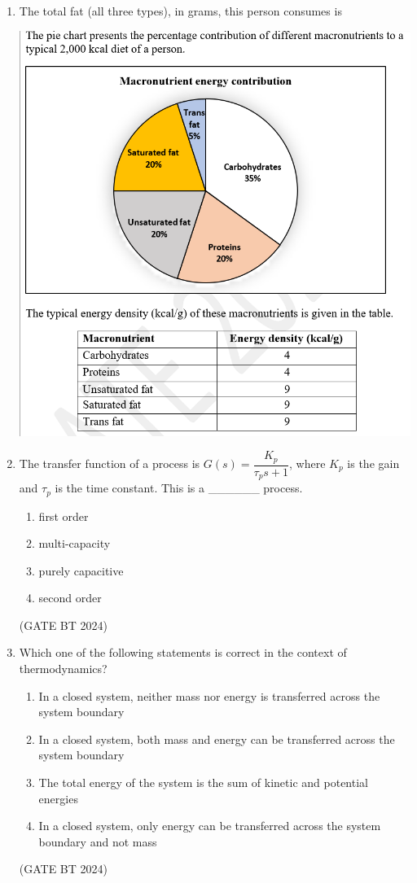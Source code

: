 \documentclass[journal,12pt,onecolumn]{IEEEtran}
\theoremstyle{remark}
\begin{document}
\begin{enumerate}
\item 
The total fat (all three types), in grams, this person consumes is
\begin{center}
\includegraphics[width=\columnwidth]{figs/table.png}
    \label{fig:macronutrient_pie}
\end{center}

\item 
The transfer function of a process is $G(s) = \dfrac{K_p}{\tau_p s + 1}$, where $K_p$ is the gain and $\tau_p$ is the time constant. This is a \_\_\_\_\_\_ process.

\begin{enumerate}
    \item first order
    \item multi-capacity
    \item purely capacitive
    \item second order
\end{enumerate}
\hfill(GATE BT 2024)

\item 
Which one of the following statements is correct in the context of thermodynamics?

\begin{enumerate}
    \item In a closed system, neither mass nor energy is transferred across the system boundary
    \item In a closed system, both mass and energy can be transferred across the system boundary
    \item The total energy of the system is the sum of kinetic and potential energies
    \item In a closed system, only energy can be transferred across the system boundary and not mass
\end{enumerate}
\hfill(GATE BT 2024)


\end{enumerate}
\end{document}
